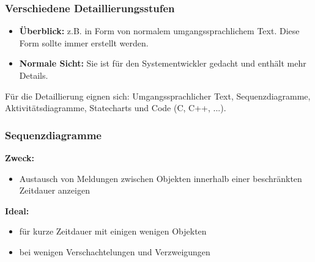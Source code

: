 \subsubsection{Verschiedene Detaillierungsstufen}
\begin{itemize}[noitemsep,topsep=0pt]
	\item \textbf{Überblick: } z.B. in Form von normalem umgangssprachlichem Text. Diese Form sollte immer erstellt werden.
	\item \textbf{Normale Sicht: } Sie ist für den Systementwickler gedacht und enthält mehr Details.
\end{itemize}

Für die Detaillierung eignen sich: Umgangssprachlicher Text, Sequenzdiagramme, Aktivitätsdiagramme, Statecharts und Code (C, C++, ...).

\subsubsection{Sequenzdiagramme}
\begin{multicols}{2}
	\textbf{Zweck:}
	\begin{itemize}[noitemsep,topsep=0pt]
		\item Austausch von Meldungen zwischen Objekten innerhalb einer beschränkten Zeitdauer anzeigen
	\end{itemize}
	\vfill\null
	\columnbreak
	\textbf{Ideal:}
	\begin{itemize}[noitemsep,topsep=0pt]
		\item für kurze Zeitdauer mit einigen wenigen Objekten
		\item bei wenigen Verschachtelungen und Verzweigungen
	\end{itemize}
\end{multicols}

